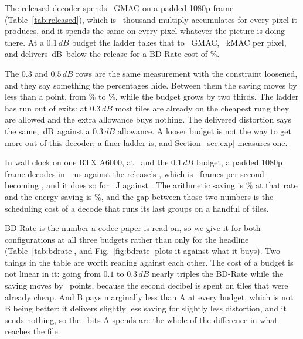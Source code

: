 \documentclass[10pt,twocolumn,letterpaper]{article}
\newcommand{\dB}{\,dB}
\begin{document}
The released decoder spends \RelGmac\ GMAC on a padded 1080p frame (Table~\ref{tab:released}), which is
\RelKMacPx\ thousand multiply-accumulates for every pixel it produces, and it
spends the same on every pixel whatever the picture is doing there. At a
$0.1\dB$ budget the ladder takes that to \GmacAtOne\ GMAC, \KmacAtOne\ kMAC per
pixel, and delivers \DbAtOne\dB\ below the release for a BD-Rate cost of
\BdRateALow\%.

The $0.3$ and $0.5\dB$ rows are the same measurement with the constraint
loosened, and they say something the percentages hide. Between them the saving
moves by less than a point, from \MeanAtThree\% to \MeanAtFive\%, while the
budget grows by two thirds. The ladder has run out of exits: at $0.3\dB$ most
tiles are already on the cheapest rung they are allowed and the extra allowance
buys nothing. The delivered distortion says the same, \DbAtThree\dB\ against a
$0.3\dB$ allowance. A looser budget is not the way to get more out of this
decoder; a finer ladder is, and Section~\ref{sec:exp} measures one.

In wall clock on one RTX A6000, at \PowerQMid\ and the $0.1\dB$ budget, a
padded 1080p frame decodes in \PowerMsMid\ ms against the release's
\PowerMsFullMid, which is \PowerFpsFullMid\ frames per second becoming
\PowerFpsMid, and it does so for \PowerJMid\ J against \PowerJFullMid. The
arithmetic saving is \PowerMacMid\% at that rate and the energy saving is
\PowerEnergyMid\%, and the gap between those two numbers is the scheduling
cost of a decode that runs its last groups on a handful of tiles.

\begin{table}[t]
\centering

\caption{\textbf{BD-Rate against the released decoder}, integrated over the five
quality indices, and what each configuration puts in the file to get it.}
\label{tab:bdrate}
\end{table}

BD-Rate is the number a codec paper is read on, so we give it for both
configurations at all three budgets rather than only for the headline
(Table~\ref{tab:bdrate}, and Fig.~\ref{fig:bdrate} plots it against what it
buys). Two things in the table are worth reading against each
other. The cost of a budget is not linear in it: going from $0.1$ to $0.3\dB$
nearly triples the BD-Rate while the saving moves by \GapBudgetPoints\ points,
because the second decibel is spent on tiles that were already cheap. And B pays
marginally less than A at every budget, which is not B being better: it delivers
slightly less saving for slightly less distortion, and it sends nothing, so the
\MapBits\ bits A spends are the whole of the difference in what reaches the
file.
\end{document}
